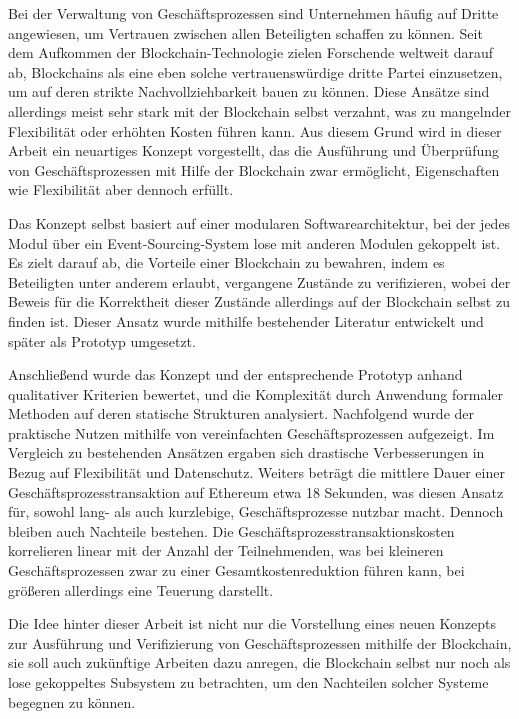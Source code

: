 \documentclass[draft,final]{vutinfth} %
\begin{document}
\begin{kurzfassung}
Bei der Verwaltung von Geschäftsprozessen sind Unternehmen häufig auf Dritte angewiesen, um Vertrauen zwischen allen Beteiligten schaffen zu können. Seit dem Aufkommen der Blockchain-Technologie zielen Forschende weltweit darauf ab, Blockchains als eine eben solche vertrauenswürdige dritte Partei einzusetzen, um auf deren strikte Nachvollziehbarkeit bauen zu können. Diese Ansätze sind allerdings meist sehr stark mit der Blockchain selbst verzahnt, was zu mangelnder Flexibilität oder erhöhten Kosten führen kann. Aus diesem Grund wird in dieser Arbeit ein neuartiges Konzept vorgestellt, das die Ausführung und Überprüfung von Geschäftsprozessen mit Hilfe der Blockchain zwar ermöglicht, Eigenschaften wie Flexibilität aber dennoch erfüllt.

Das Konzept selbst basiert auf einer modularen Softwarearchitektur, bei der jedes Modul über ein Event-Sourcing-System lose mit anderen Modulen gekoppelt ist. Es zielt darauf ab, die Vorteile einer Blockchain zu bewahren, indem es Beteiligten unter anderem erlaubt, vergangene Zustände zu verifizieren, wobei der Beweis für die Korrektheit dieser Zustände allerdings auf der Blockchain selbst zu finden ist. Dieser Ansatz wurde mithilfe bestehender Literatur entwickelt und später als Prototyp umgesetzt.

Anschließend wurde das Konzept und der entsprechende Prototyp anhand qualitativer Kriterien bewertet, und die Komplexität durch Anwendung formaler Methoden auf deren statische Strukturen analysiert. Nachfolgend wurde der praktische Nutzen mithilfe von vereinfachten Geschäftsprozessen aufgezeigt. Im Vergleich zu bestehenden Ansätzen ergaben sich drastische Verbesserungen in Bezug auf Flexibilität und Datenschutz. Weiters beträgt die mittlere Dauer einer Geschäftsprozesstransaktion auf Ethereum etwa 18 Sekunden, was diesen Ansatz für, sowohl lang- als auch kurzlebige, Geschäftsprozesse nutzbar macht. Dennoch bleiben auch Nachteile bestehen. Die Geschäftsprozesstransaktionskosten korrelieren linear mit der Anzahl der Teilnehmenden, was bei kleineren Geschäftsprozessen zwar zu einer Gesamtkostenreduktion führen kann, bei größeren allerdings eine Teuerung darstellt.

Die Idee hinter dieser Arbeit ist nicht nur die Vorstellung eines neuen Konzepts zur Ausführung und Verifizierung von Geschäftsprozessen mithilfe der Blockchain, sie soll auch zukünftige Arbeiten dazu anregen, die Blockchain selbst nur noch als lose gekoppeltes Subsystem zu betrachten, um den Nachteilen solcher Systeme begegnen zu können.
\end{kurzfassung}
\end{document}
